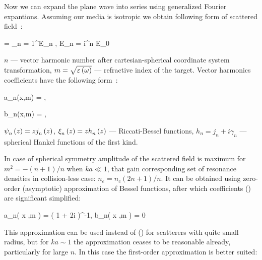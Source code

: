 Now we can expand the plane wave into series using generalized Fourier expantions. Assuming our media is isotropic we obtain following form of scattered field~\cite{boren_huffman}:

    \eq
		 = \sum_{n = 1}^{\infty}E_n , \qquad E_n = i^{n} E_0 
        \label{E_s_sph}
	\qe

$n$ --- vector harmonic number after cartesian-spherical coordinate system transformation, $m = \sqrt{\varepsilon\left(\omega\right)}$ --- refractive index of the target. Vector harmonics coefficients have the following form~\cite{boren_huffman}:


    \eq
		a_n(x,\:m) = ,
		\label{an_bessel}
	\qe

    \eq
        b_n(x,\:m) = ,
        \label{bn_bessel}
    \qe
    \eqc %
    \cqe %

\noindent ${\psi}_{n}^{} \left({z} \right) = z {j}_{n}^{} \left({z} \right)$, ${\xi}_{n}^{} \left({z} \right) = z {h}_{n}^{} \left({z} \right)$ --- Riccati-Bessel functions, $h_n = j_n + i \gamma_n$ --- spherical Hankel functions of the first kind. 

In case of spherical symmetry amplitude of the scattered field is maximum for $m^2 = - (n+ 1) / n$ when $ka \ll 1$, that gain corresponding set of resonance densities in collision-less case: $n_e = n_c(2n + 1) / n$. It can be obtained using zero-order (asymptotic) approximation of Bessel functions, after which coefficients () are significant simplified:

    \eq
        a_n\left( x ,\:m \right) = \left( 1 + 2i    \right)^{-1}, \qquad b_n\left( x ,\:m \right) = 0
        \label{ab_asymp}
    \qe

This approximation can be used instead of () for scatterers with quite small radius, but for $ka \sim 1$ the approximation ceases to be reasonable already, particularly for large $n$. In this case the first-order approximation is better suited:

